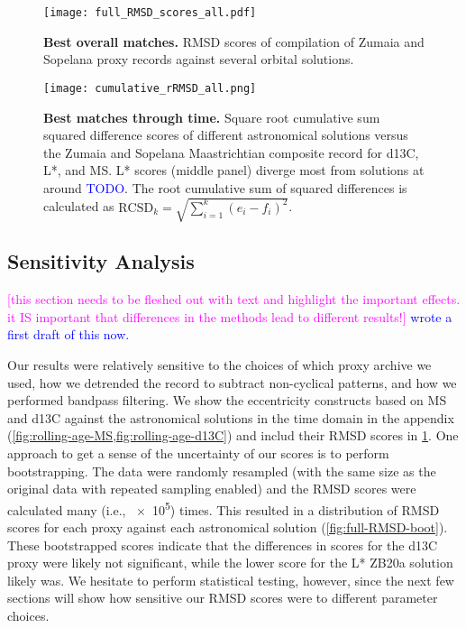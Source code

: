 \documentclass[draft]{agujournal2019}
\newcommand{\rez}{\textcolor{magenta}}
\newcommand{\ijk}{\textcolor{blue}}
\begin{document}
\begin{figure}[htb]
    \centering
    \texttt{[image: full\_RMSD\_scores\_all.pdf]}
    \caption{\label{fig:full-RMSD-all} %
      \textbf{Best overall matches.}
        \gls{RMSD} scores of compilation of Zumaia and Sopelana proxy records against several orbital solutions.
    }
\end{figure}

\begin{figure}[htb]
  \centering
  \texttt{[image: cumulative\_rRMSD\_all.png]}
  \caption{\label{fig:cum-RMSD-all}
    \textbf{Best matches through time.}
    Square root cumulative sum squared difference scores of
    different astronomical solutions versus the Zumaia and Sopelana Maastrichtian composite record
    for \gls{d13C}, \gls{L*}, and \gls{MS}.
    \gls{L*} scores (middle panel) diverge most from solutions at around \ijk{TODO}.
    The root cumulative sum of squared differences is calculated as \(\text{RCSD}_{k} = \sqrt{\sum_{i=1}^{k}(e_{i} - f_{i})^{2}}\).
  }
\end{figure}


\subsection{Sensitivity Analysis}
\rez{[this section needs to be fleshed out with text and highlight the important effects. it IS important that differences in the methods lead to different results!]}
\ijk{wrote a first draft of this now.}

Our results were relatively sensitive to the choices of which proxy archive we used, how we detrended the record to subtract non-cyclical patterns, and how we performed bandpass filtering.
We show the eccentricity constructs based on \gls{MS} and \gls{d13C} against the astronomical solutions in the time domain in the appendix (\cref{fig:rolling-age-MS,fig:rolling-age-d13C}) and includ their \gls{RMSD} scores in \cref{fig:full-RMSD-all}.
One approach to get a sense of the uncertainty of our  scores is to perform bootstrapping.
The data were randomly resampled (with the same size as the original data with repeated sampling enabled) and the \gls{RMSD} scores were calculated many (i.e., \num{e5}) times.
This resulted in a distribution of \gls{RMSD} scores for each proxy against each astronomical solution (\ref{fig:full-RMSD-boot}).
These bootstrapped scores indicate that the differences in scores for the \gls{d13C} proxy were likely not significant, while the lower score for the \gls{L*} ZB20a solution likely was.
We hesitate to perform statistical testing, however, since the next few sections will show how sensitive our \gls{RMSD} scores were to different parameter choices.
\end{document}
